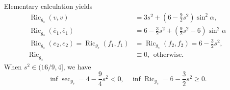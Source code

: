 \documentclass[11pt,letterpaper]{amsart}
\DeclareMathOperator{\Ric}{Ric}
\newcommand{\ove}{\overline{e}}
\theoremstyle{definition}
\theoremstyle{remark}
\numberwithin{equation}{section}
\begin{document}
Elementary calculation yields
\begin{equation*}
    \begin{split}
        \Ric_{g_s}(v,v)&=3s^2+\left(6-\frac{9}{2}s^2\right)\sin^2 \alpha, \\
        \Ric_{g_s}(\ove_1,\ove_1)&=6-\frac{3}{2}s^2+\left(\frac{9}{2}s^2-6\right)\sin^2 \alpha\\
        \Ric_{g_s}(e_2,e_2)=\Ric_{g_s}(f_1,f_1)&=\Ric_{g_s}(f_2,f_2)=6-\frac{3}{2}s^2,\\
        \Ric_{g_s}& \equiv 0,  ~~\mbox{otherwise.}~~
    \end{split}
\end{equation*}
When $s^2\in (16/9,4]$, we have
\begin{equation*}
\inf \sec_{g_s}=4-\frac{9}{4}s^2<0, \quad     \inf \Ric_{g_s}=6-\frac{3}{2}s^2\geq 0.
\end{equation*}
\end{document}
